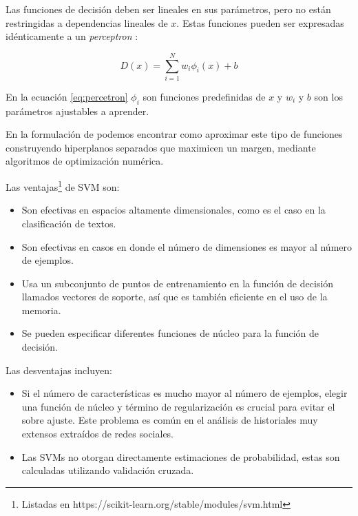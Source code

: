 Las funciones de decisión deben ser lineales en sus parámetros, pero no están restringidas a dependencias lineales de $x$. Estas funciones pueden ser expresadas idénticamente a un \textit{perceptron }\citep{block1962analysis}:

\begin{equation} \label{eq:percetron}
    D(x) = \sum_{i=1}^{N} w_i\phi_i(x) + b
\end{equation}

En la ecuación \ref{eq:percetron} $ \phi_i$ son funciones predefinidas de $x$ y $w_i$ y $b$ son los parámetros ajustables a aprender.

En la formulación de \citep{boser1992training, cortes1995support} podemos encontrar como aproximar este tipo de funciones construyendo hiperplanos separados que maximicen un margen, mediante algoritmos de optimización numérica.

Las ventajas\footnote{Listadas en https://scikit-learn.org/stable/modules/svm.html} de SVM son: 
\begin{itemize}
    \item Son efectivas en espacios altamente dimensionales, como es el caso en la clasificación de textos.
    \item Son efectivas en casos en donde el número de dimensiones es mayor al número de ejemplos.
    \item Usa un subconjunto de puntos de entrenamiento en la función de decisión llamados vectores de soporte, así que es también eficiente en el uso de la memoria.
    \item Se pueden especificar diferentes funciones de núcleo para la función de decisión. 
\end{itemize}

Las desventajas incluyen:
\begin{itemize}
    \item Si el número de características es mucho mayor al número de ejemplos, elegir una función de núcleo y término de regularización es crucial para evitar el sobre ajuste. Este problema es común en el análisis de historiales muy extensos extraídos de redes sociales.
    \item Las SVMs no otorgan directamente estimaciones de probabilidad, estas son calculadas utilizando validación cruzada.
    
\end{itemize}
    
    

